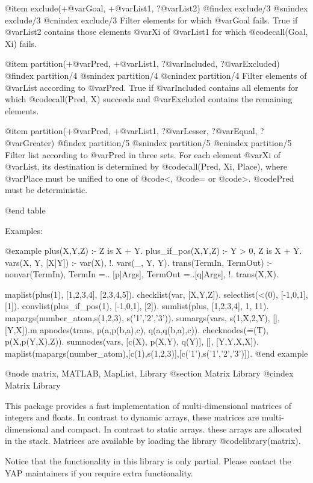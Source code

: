 {{{{{{{{@item exclude(+@var{Goal}, +@var{List1}, ?@var{List2})
@findex exclude/3
@snindex exclude/3
@cnindex exclude/3
Filter elements for which @var{Goal} fails. True if @var{List2} contains
      those elements @var{Xi} of @var{List1} for which @code{call(Goal, Xi)} fails.

@item partition(+@var{Pred},  +@var{List1}, ?@var{Included}, ?@var{Excluded})
@findex partition/4
@snindex partition/4
@cnindex partition/4
Filter elements of @var{List} according to @var{Pred}. True if
@var{Included} contains all elements for which @code{call(Pred, X)}
succeeds and @var{Excluded} contains the remaining elements.

@item partition(+@var{Pred},  +@var{List1}, ?@var{Lesser}, ?@var{Equal}, ?@var{Greater})
@findex partition/5
@snindex partition/5
@cnindex partition/5
Filter list according to @var{Pred} in three sets. For each element
@var{Xi} of @var{List}, its destination is determined by
@code{call(Pred, Xi, Place)}, where @var{Place} must be unified to one
of @code{<}, @code{=} or @code{>}. @code{Pred} must be deterministic.

@end table

Examples:

@example
plus(X,Y,Z) :- Z is X + Y.
plus_if_pos(X,Y,Z) :- Y > 0, Z is X + Y.
vars(X, Y, [X|Y]) :- var(X), !.
vars(_, Y, Y).
trans(TermIn, TermOut) :-
  nonvar(TermIn),
  TermIn =.. [p|Args],
  TermOut =..[q|Args], !.
trans(X,X).


maplist(plus(1), [1,2,3,4], [2,3,4,5]).
checklist(var, [X,Y,Z]).
selectlist(<(0), [-1,0,1], [1]).
convlist(plus_if_pos(1), [-1,0,1], [2]).
sumlist(plus, [1,2,3,4], 1, 11).
mapargs(number_atom,s(1,2,3), s('1','2','3')).
sumargs(vars, s(1,X,2,Y), [], [Y,X]).m
apnodes(trans, p(a,p(b,a),c), q(a,q(b,a),c)).
checknodes(\==(T), p(X,p(Y,X),Z)).
sumnodes(vars, [c(X), p(X,Y), q(Y)], [], [Y,Y,X,X]).
maplist(mapargs(number_atom),[c(1),s(1,2,3)],[c('1'),s('1','2','3')]).
@end example

@node matrix, MATLAB, MapList, Library
@section Matrix Library
@cindex Matrix Library

This package provides a fast implementation of multi-dimensional
matrices of integers and floats. In contrast to dynamic arrays, these
matrices are multi-dimensional and compact. In contrast to static
arrays. these arrays are allocated in the stack. Matrices are available
by loading the library @code{library(matrix)}.

Notice that the functionality in this library is only partial. Please
contact the YAP maintainers if you require extra functionality.

}}}}}}}}
